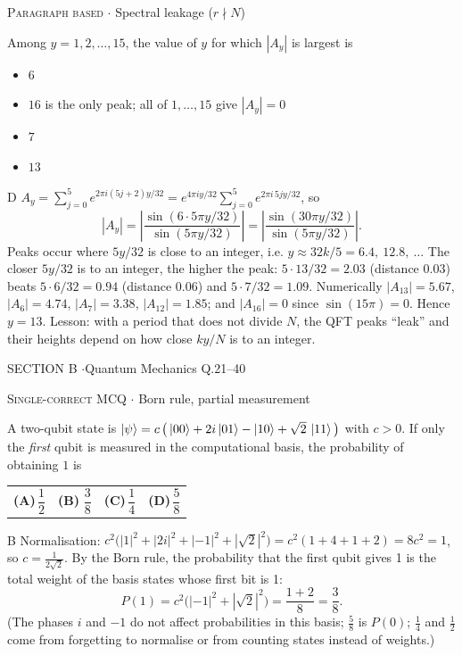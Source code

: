 \documentclass[11pt,a4paper]{article}
\newcommand{\optlabel}[1]{\textbf{(#1)}}
\newcommand{\correctlabel}[1]{\textcolor{okgreen}{\textbf{(#1)}\,\ding{51}}}
\newenvironment{qitem}[1]{\begin{list}{}{\setlength{\leftmargin}{3.3em}\setlength{\labelwidth}{3.1em}%
  \setlength{\labelsep}{0.2em}\setlength{\topsep}{3pt}\setlength{\parsep}{3pt}}\item[\textbf{Q.#1}\hfill]}{\end{list}}
\newcommand{\qsep}{\par\vspace{2pt}{\color{black!15}\hrule}\vspace{4pt}}
\newcommand{\qmeta}[2]{{\footnotesize\color{black!60}\textsc{#1} \;$\cdot$\; #2}\par}
\begin{document}
\begin{qitem}{20}
\qmeta{Paragraph based}{Spectral leakage ($r\nmid N$)}
Among $y = 1, 2, \dots, 15$, the value of $y$ for which $|A_y|$ is largest is
\begin{itemize}[leftmargin=2.6em, labelsep=0.4em, itemsep=2pt, topsep=3pt]
\item[\optlabel{A}] $6$
\item[\optlabel{B}] $16$ is the only peak; all of $1,\dots,15$ give $|A_y| = 0$
\item[\optlabel{C}] $7$
\item[\correctlabel{D}] $13$
\end{itemize}
\end{qitem}
\begin{solbox}{D}
$A_y = \sum_{j=0}^{5} e^{2\pi i (5j+2)y/32} = e^{4\pi i y/32}\sum_{j=0}^{5} e^{2\pi i\,5jy/32}$, so
\[ |A_y| = \left|\frac{\sin(6\cdot 5\pi y/32)}{\sin(5\pi y/32)}\right| = \left|\frac{\sin(30\pi y/32)}{\sin(5\pi y/32)}\right| . \]
Peaks occur where $5y/32$ is close to an integer, i.e. $y \approx 32k/5 = 6.4,\ 12.8,\ \dots$ The closer $5y/32$ is to an
integer, the higher the peak: $5\cdot13/32 = 2.03$ (distance $0.03$) beats $5\cdot6/32 = 0.94$ (distance $0.06$) and
$5\cdot7/32 = 1.09$. Numerically $|A_{13}| = 5.67$, $|A_6| = 4.74$, $|A_7| = 3.38$, $|A_{12}| = 1.85$; and $|A_{16}| = 0$ since
$\sin(15\pi) = 0$. Hence $y = 13$. Lesson: with a period that does not divide $N$, the QFT peaks ``leak'' and their
heights depend on how close $ky/N$ is to an integer.
\end{solbox}
\qsep

\newpage

\begin{sectionbanner}SECTION B \enspace$\cdot$\enspace Quantum Mechanics \hfill Q.21--40\end{sectionbanner}

\begin{qitem}{21}
\qmeta{Single-correct MCQ}{Born rule, partial measurement}
A two-qubit state is $\ket{\psi} = c\,\big(\ket{00} + 2i\ket{01} - \ket{10} + \sqrt2\,\ket{11}\big)$ with $c > 0$.
If only the \emph{first} qubit is measured in the computational basis, the probability of obtaining $1$ is
\par\smallskip\noindent\begin{tabularx}{\linewidth}{@{}*{4}{L}@{}}
\optlabel{A}\,$\dfrac12$ & \correctlabel{B}\,$\dfrac38$ & \optlabel{C}\,$\dfrac14$ & \optlabel{D}\,$\dfrac58$
\end{tabularx}
\end{qitem}
\begin{solbox}{B}
Normalisation: $c^2\big(|1|^2 + |2i|^2 + |-1|^2 + |\sqrt2|^2\big) = c^2(1 + 4 + 1 + 2) = 8c^2 = 1$, so $c = \frac{1}{2\sqrt2}$.
By the Born rule, the probability that the first qubit gives 1 is the total weight of the basis states whose first bit is 1:
\[ P(1) = c^2\big(|-1|^2 + |\sqrt2|^2\big) = \frac{1 + 2}{8} = \frac38 . \]
(The phases $i$ and $-1$ do not affect probabilities in this basis; $\frac58$ is $P(0)$; $\frac14$ and $\frac12$ come from
forgetting to normalise or from counting states instead of weights.)
\end{solbox}
\qsep
\end{document}
